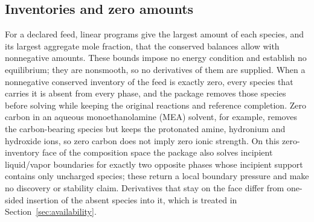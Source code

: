 \subsection{Inventories and zero amounts}
For a declared feed, linear programs give the largest amount of each species, and its largest aggregate mole fraction, that the conserved balances allow with nonnegative amounts.
These bounds impose no energy condition and establish no equilibrium; they are nonsmooth, so no derivatives of them are supplied.
When a nonnegative conserved inventory of the feed is exactly zero, every species that carries it is absent from every phase, and the package removes those species before solving while keeping the original reactions and reference completion.
Zero carbon in an aqueous monoethanolamine (MEA) solvent, for example, removes the carbon-bearing species but keeps the protonated amine, hydronium and hydroxide ions, so zero carbon does not imply zero ionic strength.
On this zero-inventory face of the composition space the package also solves incipient liquid/vapor boundaries for exactly two opposite phases whose incipient support contains only uncharged species; these return a local boundary pressure and make no discovery or stability claim.
Derivatives that stay on the face differ from one-sided insertion of the absent species into it, which is treated in Section~\ref{sec:availability}.

